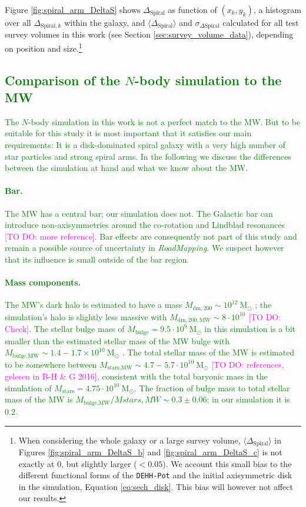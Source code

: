 \documentclass[iop,revtex4,numberedappendix,appendixfloats]{emulateapj}
\newcommand{\RM}{{\sl RoadMapping}}
\newcommand{\Wilma}[1]{\textcolor{Magenta}{#1}}
\newcommand{\NEW}[1]{\textcolor{Green}{#1}}
\begin{document}
Figure \ref{fig:spiral_arm_DeltaS} shows $\Delta_\text{Spiral}$ as function of $(x_k,y_k)$, a histogram over all $\Delta_{\text{Spiral},k}$ within the galaxy, and $\langle \Delta_\text{Spiral} \rangle$ and $\sigma_{\Delta\text{Spiral}}$ calculated for all test survey volumes in this work (see Section \ref{sec:survey_volume_data}), depending on position and size.\footnote{When considering the whole galaxy or a large survey volume, $\langle \Delta_\text{Spiral} \rangle$ in Figures \ref{fig:spiral_arm_DeltaS_b} and \ref{fig:spiral_arm_DeltaS_c} is not exactly at $0$, but slightly larger ($<0.05$). We account this small bias to the different functional forms of the \texttt{DEHH-Pot} and the initial axisymmetric disk in the simulation, Equation \eqref{eq:sech_disk}. This bias will however not affect our results.}

\subsection{\NEW{Comparison of the $N$-body simulation to the MW}} \label{sec:comparison_with_MW}

\NEW{The $N$-body simulation in this work is not a perfect match to the MW. But to be suitable for this study it is most important that it satisfies our main requirements:  It is a disk-dominated spiral galaxy with a very high number of star particles and strong spiral arms. In the following we discuss the differences between the simulation at hand and what we know about the MW.}

\NEW{\paragraph{Bar.} The MW has a central bar; our simulation does not. The Galactic bar can introduce non-axisymmetries around the co-rotation and Lindblad resonances \citep{2000AJ....119..800D} \Wilma{[TO DO:  more reference]}. Bar effects are consequently not part of this study and remain a possible source of uncertainty  in \RM{}. We suspect however that its influence is small outside of the bar region.}

\NEW{\paragraph{Mass components.} The MW's dark halo is estimated to have a mass $M_{\text{dm},200}\sim10^{12}~\text{M}_\odot$ \citep{2016ARA&A..54..529B}; the simulation's halo is slightly less massive with $M_{\text{dm},200,\text{MW}}\sim8\cdot10^{10}$ \Wilma{[TO DO: Check]}. The stellar bulge mass of $M_\text{bulge}=9.5\cdot 10^9~\text{M}_\odot$ in this simulation is a bit smaller than the estimated stellar mass of the MW bulge with $M_\text{bulge,MW} \sim1.4-1.7 \times 10^{10}~\text{M}_\odot$ \citep{2015MNRAS.448..713P}. The total stellar mass of the MW is estimated to be somewhere between $M_\text{stars,MW}\sim4.7-5.7\cdot 10^{10}~  \text{M}_\odot$ \Wilma{[TO DO: references, gelesen in B-H \& G 2016]}, consistent with the total baryonic mass in the simulation of $M_\text{stars}=4.75\cdot10^{10}~  \text{M}_\odot$. The fraction of bulge mass to total stellar mass of the MW is $M_\text{bulge,MW}/M{stars,MW}\sim0.3\pm0.06$; in our simulation it is $0.2$.}
\end{document}
